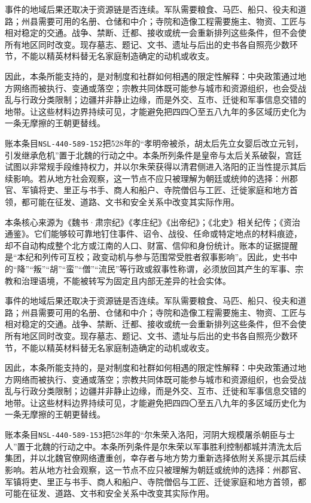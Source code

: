 事件的地域后果还取决于资源链是否连续。军队需要粮食、马匹、船只、役夫和道路；州县需要可用的名册、仓储和中介；寺院和造像工程需要施主、物资、工匠与相对稳定的交通。战争、禁断、迁都、接收或统一会重新排列这些条件，但不会使所有地区同时改变。现存墓志、题记、文书、遗址与后出的史书各自照亮少数环节，不能以精英材料替无名家庭制造确定的动机或收支。

因此，本条所能支持的，是对制度和社群如何相遇的限定性解释：中央政策通过地方网络而被执行、变通或落空；宗教共同体既可能参与城市和资源组织，也会受战乱与行政分类限制；边疆并非静止边缘，而是外交、互市、迁徙和军事信息交错的地带。让这些材料边界持续可见，才能避免把四四〇至五八九年的多区域历史化为一条无摩擦的王朝更替线。

账本条目\texttt{NSL-440-589-152}把528年的“孝明帝被杀，胡太后先立女婴后改立元钊，引发继承危机”置于北魏的行动之中。本条所列条件是皇帝与太后关系破裂，宫廷试图以非常规手段维持权力，并以尔朱荣获得以清君侧进入洛阳的正当性提示其后续影响。若从地方社会观察，这一节点不应只被理解为朝廷或统帅的选择：州郡官、军镇将吏、里正与书手、商人和船户、寺院僧侣与工匠、迁徙家庭和地方首领，都可能在征发、道路、文书和安全关系中改变其实际作用。

本条核心来源为《魏书·肃宗纪》《孝庄纪》《出帝纪》；《北史》相关纪传；《资治通鉴》。它们能够较可靠地钉住事件、诏令、战役、任命或特定地点的材料痕迹，却不自动构成整个北方或江南的人口、财富、信仰和身份统计。账本的证据提醒是“本纪和列传可互校；政变动机与参与范围常受胜者叙事影响”。因此，史书中的“降”“叛”“胡”“蛮”“僧”“流民”等行政或叙事性称谓，必须放回其产生的军事、宗教和治理语境，不能被转写为固定且内部无差异的社会实体。

事件的地域后果还取决于资源链是否连续。军队需要粮食、马匹、船只、役夫和道路；州县需要可用的名册、仓储和中介；寺院和造像工程需要施主、物资、工匠与相对稳定的交通。战争、禁断、迁都、接收或统一会重新排列这些条件，但不会使所有地区同时改变。现存墓志、题记、文书、遗址与后出的史书各自照亮少数环节，不能以精英材料替无名家庭制造确定的动机或收支。

因此，本条所能支持的，是对制度和社群如何相遇的限定性解释：中央政策通过地方网络而被执行、变通或落空；宗教共同体既可能参与城市和资源组织，也会受战乱与行政分类限制；边疆并非静止边缘，而是外交、互市、迁徙和军事信息交错的地带。让这些材料边界持续可见，才能避免把四四〇至五八九年的多区域历史化为一条无摩擦的王朝更替线。

账本条目\texttt{NSL-440-589-153}把528年的“尔朱荣入洛阳，河阴大规模屠杀朝臣与士人”置于北魏的行动之中。本条所列条件是尔朱荣以军事胜利控制都城并清洗太后集团，并以北魏官僚网络遭重创，幸存者与地方势力重新选择依附关系提示其后续影响。若从地方社会观察，这一节点不应只被理解为朝廷或统帅的选择：州郡官、军镇将吏、里正与书手、商人和船户、寺院僧侣与工匠、迁徙家庭和地方首领，都可能在征发、道路、文书和安全关系中改变其实际作用。

